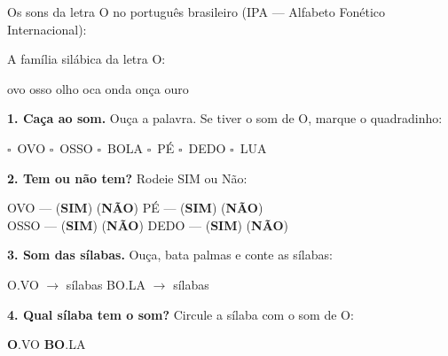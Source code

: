 
\begin{sonsdaletra}
Os sons da letra O no portugu\^es{} brasileiro (IPA --- Alfabeto Fon\'etico Internacional):

\end{sonsdaletra}


\begin{familiasilabica}
A fam\'ilia sil\'abica da letra O:

\begin{center}
ovo \quad osso \quad olho \quad oca \quad onda \quad on\c{c}a \quad ouro
\end{center}
\end{familiasilabica}


\begin{somletra}
\textbf{1. Ca\c{c}a ao som.} Ou\c{c}a a palavra. Se tiver o som de O, marque o quadradinho:
\begin{center}
$\square$~OVO \quad $\square$~OSSO \quad $\square$~BOLA \quad $\square$~P\'E \quad $\square$~DEDO \quad $\square$~LUA
\end{center}

\textbf{2. Tem ou n\~ao{} tem?} Rodeie SIM ou N\~ao:
\begin{center}
OVO --- (\textbf{SIM}) (\textbf{N\~AO}) \quad P\'E --- (\textbf{SIM}) (\textbf{N\~AO}) \\ OSSO --- (\textbf{SIM}) (\textbf{N\~AO}) \quad DEDO --- (\textbf{SIM}) (\textbf{N\~AO})
\end{center}
\end{somletra}

\begin{somsilaba}
\textbf{3. Som das s\'ilabas.} Ou\c{c}a, bata palmas e conte as s\'ilabas:
\begin{center}
O.VO $\rightarrow$ \underline{\hspace{1cm}} s\'ilabas \quad BO.LA $\rightarrow$ \underline{\hspace{1cm}} s\'ilabas
\end{center}

\textbf{4. Qual s\'ilaba tem o som?} Circule a s\'ilaba com o som de O:
\begin{center}
\textbf{O}.VO \quad \textbf{BO}.LA
\end{center}
\end{somsilaba}


